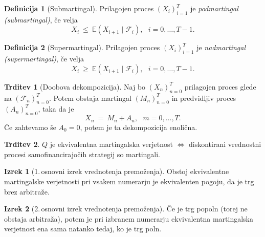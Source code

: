 \documentclass[11pt]{article}
\newcommand{\E}{\mathbb{E}}
\newcommand{\F}{\mathcal{F}}
\newcommand{\1}{\mathbbm{1}}
\theoremstyle{definition}
\newtheorem{definicija}{Definicija}[section]
\theoremstyle{definition}
\newtheorem{trditev}{Trditev}[section]
\newtheorem{izrek}{Izrek}[section]
\begin{document}
\begin{definicija}[Submartingal]

Prilagojen proces $(X_i)_{i=1}^T$ je \textit{podmartingal (submartingal)}, če velja
$$X_i ~\leq~ \E(X_{i+1} \mid \F_i), ~~~i=0, \ldots, T-1.$$

\end{definicija}
\vspace{0.5cm}

\begin{definicija}[Supermartingal]

Prilagojen proces $(X_i)_{i=1}^T$ je \textit{nadmartingal (supermartingal)}, če velja
$$X_i ~\geq~ \E(X_{i+1} \mid \F_i), ~~~i=0, \ldots, T-1.$$

\end{definicija}
\vspace{0.5cm}

\begin{trditev}[Doobova dekompozicija]

Naj bo $(X_n)_{n=0}^T$ prilagojen proces glede na $(\F_n)_{n=0}^T$. Potem obstaja martingal $(M_n)_{n=0}^T$ in predvidljiv proces $(A_n)_{n=0}^T$, taka da je
$$X_n ~=~ M_n + A_n, ~~~m = 0, \ldots, T.$$
Če zahtevamo še $A_0 = 0$, potem je ta dekompozicija enolična.

\end{trditev}
\vspace{0.5cm}

\begin{trditev}

$Q$ je ekvivalentna martingalska verjetnost $\iff$ diskontirani vrednostni procesi samofinancirajočih strategij so martingali.

\end{trditev}
\vspace{0.5cm}

\begin{izrek}[1.\,osnovni izrek vrednotenja premoženja]

Obstoj ekvivalentne martingalske verjetnosti pri vsakem numerarju je ekvivalenten pogoju, da je trg brez arbitraže.

\end{izrek}
\vspace{0.5cm}

\begin{izrek}[2.\,osnovni izrek vrednotenja premoženja]

Če je trg popoln (torej ne obstaja arbitraža), potem je pri izbranem numerarju ekvivalentna martingalska verjetnost ena sama natanko tedaj, ko je trg poln.

\end{izrek}
\vspace{0.5cm}
\end{document}
